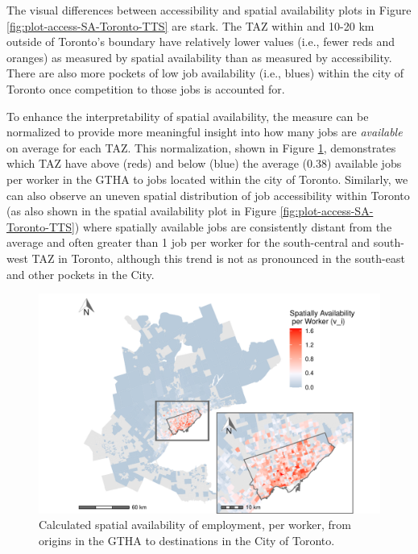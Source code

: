 \documentclass[]{elsarticle} %
\begin{document}
\newpage

The visual differences between accessibility and spatial availability
plots in Figure \ref{fig:plot-access-SA-Toronto-TTS} are stark. The TAZ
within and 10-20 km outside of Toronto's boundary have relatively lower
values (i.e., fewer reds and oranges) as measured by spatial
availability than as measured by accessibility. There are also more
pockets of low job availability (i.e., blues) within the city of Toronto
once competition to those jobs is accounted for.

To enhance the interpretability of spatial availability, the measure can
be normalized to provide more meaningful insight into how many jobs are
\emph{available} on average for each TAZ. This normalization, shown in
Figure \ref{fig:plot-avail-Toronto-TTS-per-worker}, demonstrates which
TAZ have above (reds) and below (blue) the average (0.38) available jobs
per worker in the GTHA to jobs located within the city of Toronto.
Similarly, we can also observe an uneven spatial distribution of job
accessibility within Toronto (as also shown in the spatial availability
plot in Figure \ref{fig:plot-access-SA-Toronto-TTS}) where spatially
available jobs are consistently distant from the average and often
greater than 1 job per worker for the south-central and south-west TAZ
in Toronto, although this trend is not as pronounced in the south-east
and other pockets in the City.

\begin{figure}
\includegraphics[width=1\linewidth]{Spatial-Availability_files/figure-latex/plot-avail-Toronto-TTS-per-worker-1} \caption{\label{fig:plot-avail-Toronto-TTS-per-worker}Calculated spatial availability of employment, per worker, from origins in the GTHA to destinations in the City of Toronto.}\label{fig:plot-avail-Toronto-TTS-per-worker}
\end{figure}
\end{document}
